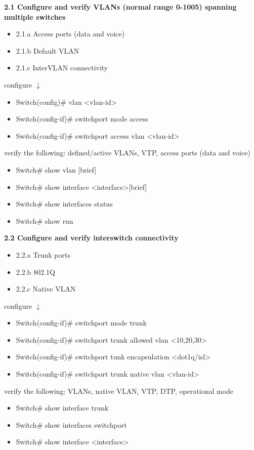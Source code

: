 \documentclass{article}
\begin{document}
\textbf{2.1 Configure and verify VLANs (normal range 0-1005) spanning multiple switches}
\begin{itemize}
\item 2.1.a Access ports (data and voice)
\item 2.1.b Default VLAN
\item 2.1.c InterVLAN connectivity
\end{itemize}

configure $\downarrow$
\begin{itemize}
\item Switch(config)\# vlan \textless vlan-id\textgreater
\item Switch(config-if)\# switchport mode access
\item Switch(config-if)\# switchport access vlan \textless vlan-id\textgreater
\end{itemize}

verify the following: defined/active VLANs, VTP, access ports (data and voice)
\begin{itemize}
\item Switch\# show vlan [brief]
\item Switch\# show interface \textless interface\textgreater [brief]
\item Switch\# show interfaces status
\item Switch\# show run
\end{itemize}
  	
\textbf{2.2 Configure and verify interswitch connectivity}
\begin{itemize}
\item 2.2.a Trunk ports
\item 2.2.b 802.1Q
\item 2.2.c Native VLAN
\end{itemize}

configure $\downarrow$
\begin{itemize}
\item Switch(config-if)\# switchport mode trunk
\item Switch(config-if)\# switchport trunk allowed vlan \textless 10,20,30\textgreater
\item Switch(config-if)\# switchport tunk encapsulation \textless dot1q/isl\textgreater
\item Switch(config-if)\# switchport trunk native vlan \textless vlan-id\textgreater
\end{itemize}

verify the following: VLANs, native VLAN, VTP, DTP, operational mode
\begin{itemize}
\item Switch\# show interface trunk
\item Switch\# show interfaces switchport
\item Switch\# show interface \textless interface\textgreater
\end{itemize}
  		
\end{document}
